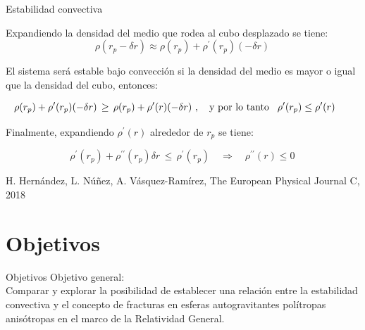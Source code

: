 \documentclass[handout,t]{beamer}
\begin{document}
\begin{frame}{Estabilidad convectiva}

\justifying

Expandiendo la densidad del medio que rodea al cubo desplazado se tiene:
    \begin{equation*}
    \rho (r_{p} - \delta r) \approx \rho (r_{p}) + \rho^{\prime} (r_{p})(- \delta r) \, 
\end{equation*}

El sistema será estable bajo convección si la densidad del medio es mayor o igual que la densidad del cubo, entonces:

\vspace{-4mm}

\begin{equation*}
\hspace{-6mm}
    \rho(r_{p}) + \rho^{\prime} (r_{p})(- \delta r) \, \geq \, \rho(r_{p}) + \rho^{\prime}(r)(- \delta r) \, \, , \quad \text{y por lo tanto} \hspace{3mm} \rho^{\prime}(r_{p}) \leq \rho^{\prime}(r)
\end{equation*}

Finalmente, expandiendo $\rho^{\prime}(r)$ alrededor de $r_{p}$ se tiene:

\begin{equation*}
    \rho^{\prime}(r_{p}) + \rho^{\prime \prime} (r_{p}) \delta r \, \leq \, \rho^{\prime}(r_{p}) \quad \Rightarrow \quad \rho^{\prime \prime} (r) \leq 0 \, 
\end{equation*}

\vspace{6mm}

\tiny H. Hernández, L. Núñez, A. Vásquez-Ramírez, The European Physical Journal C, 2018

\end{frame}






\section{Objetivos}
\begin{frame}{Objetivos}
\vspace{10mm}
Objetivo general: \\
\vspace{8mm}
\justifying
Comparar y explorar la posibilidad de establecer una relación entre la estabilidad convectiva y el concepto de fracturas en esferas autogravitantes polítropas anisótropas en el marco de la Relatividad General. \\

\end{frame}
\end{document}
